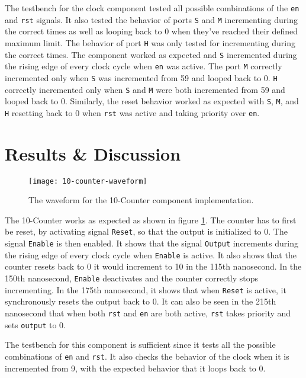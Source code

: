 \documentclass[11pt]{report}
\begin{document}
The testbench for the clock component tested all possible combinations of the \verb|en| and
\verb|rst| signals. It also tested the behavior of ports \verb|S| and \verb|M| incrementing during
the correct times as well as looping back to 0 when they've reached their defined maximum limit. The
behavior of port \verb|H| was only tested for incrementing during the correct times. The component
worked as expected and \verb|S| incremented during the rising edge of every clock cycle when
\verb|en| was active. The port \verb|M| correctly incremented only when \verb|S| was incremented
from 59 and looped back to 0. \verb|H| correctly incremented only when \verb|S| and \verb|M| were
both incremented from 59 and looped back to 0. Similarly, the reset behavior worked as expected with
\verb|S|, \verb|M|, and \verb|H| resetting back to 0 when \verb|rst| was active and taking priority
over \verb|en|.

\newpage

\section*{Results \& Discussion}
\begin{figure}[h!]
    \centering
    \texttt{[image: 10-counter-waveform]}
    \caption{
        The waveform for the 10-Counter component implementation.
    }
    \label{fig:10-counter-waveform}
\end{figure}

The 10-Counter works as expected as shown in figure \ref{fig:10-counter-waveform}. The counter has
to first be reset, by activating signal \verb|Reset|, so that the output is initialized to 0. The
signal \verb|Enable| is then enabled. It shows that the signal \verb|Output| increments during the
rising edge of every clock cycle when \verb|Enable| is active. It also shows that the counter resets
back to 0 it would increment to 10 in the 115th nanosecond. In the 150th nanosecond, \verb|Enable|
deactivates and the counter correctly stops incrementing. In the 175th nanosecond, it shows that
when \verb|Reset| is active, it synchronously resets the output back to 0. It can also be seen in
the 215th nanosecond that when both \verb|rst| and \verb|en| are both active, \verb|rst| takes
priority and sets \verb|output| to 0. 

The testbench for this component is sufficient since it tests all the possible combinations of
\verb|en| and \verb|rst|. It also checks the behavior of the clock when it is incremented from 9,
with the expected behavior that it loops back to 0.
\end{document}
